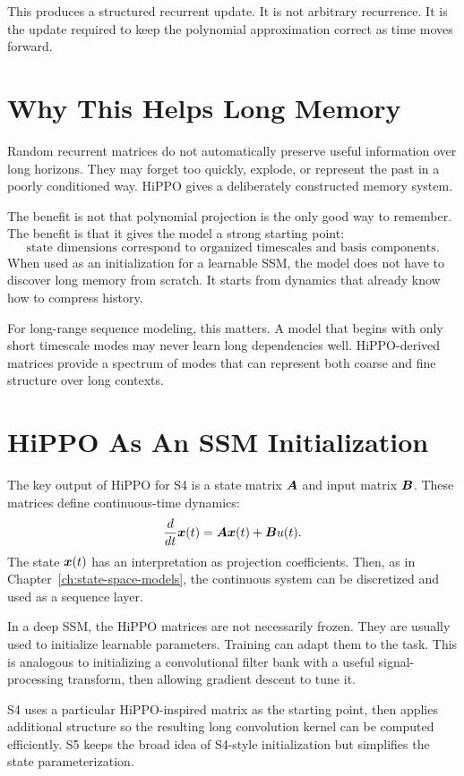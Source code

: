 This produces a structured recurrent update. It is not arbitrary recurrence. It is the
update required to keep the polynomial approximation correct as time moves forward.

\section{Why This Helps Long Memory}

Random recurrent matrices do not automatically preserve useful information over long
horizons. They may forget too quickly, explode, or represent the past in a poorly
conditioned way. HiPPO gives a deliberately constructed memory system.

The benefit is not that polynomial projection is the only good way to remember. The
benefit is that it gives the model a strong starting point:
\[
  \text{state dimensions correspond to organized timescales and basis components}.
\]
When used as an initialization for a learnable SSM, the model does not have to discover
long memory from scratch. It starts from dynamics that already know how to compress
history.

For long-range sequence modeling, this matters. A model that begins with only short
timescale modes may never learn long dependencies well. HiPPO-derived matrices provide
a spectrum of modes that can represent both coarse and fine structure over long contexts.

\section{HiPPO As An SSM Initialization}

The key output of HiPPO for S4 is a state matrix $\bm{A}$ and input matrix $\bm{B}$. These
matrices define continuous-time dynamics:
\[
  \frac{d}{dt}\bm{x}(t)=\bm{A}\bm{x}(t)+\bm{B} u(t).
\]
The state $\bm{x}(t)$ has an interpretation as projection coefficients. Then, as in
Chapter~\ref{ch:state-space-models}, the continuous system can be discretized and used
as a sequence layer.

In a deep SSM, the HiPPO matrices are not necessarily frozen. They are usually used to
initialize learnable parameters. Training can adapt them to the task. This is analogous
to initializing a convolutional filter bank with a useful signal-processing transform,
then allowing gradient descent to tune it.

S4 uses a particular HiPPO-inspired matrix as the starting point, then applies additional
structure so the resulting long convolution kernel can be computed efficiently. S5 keeps
the broad idea of S4-style initialization but simplifies the state parameterization.

